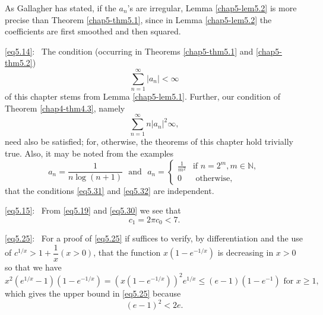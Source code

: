 \begin{lemma}\label{chap5-lem5.3}
As Gallagher \cite{key4} has stated, if the $a_n$'s are irregular,
Lemma \ref{chap5-lem5.2} is more precise than Theorem
\ref{chap5-thm5.1}, since in Lemma \ref{chap5-lem5.2} the coefficients
are first smoothed and then squared. 
\end{lemma}

\eqref{eq5.14}:~ The condition (occurring in Theorems
\ref{chap5-thm5.1} and \ref{chap5-thm5.2}) 
\begin{equation*}
\sum_{n=1}^\infty | a_n | < \infty \tag{5.31}\label{eq5.31}
\end{equation*}
of this chapter stems from Lemma \ref{chap5-lem5.1}. Further, our
condition of Theorem \ref{chap4-thm4.3}, namely 
\begin{equation*}
\sum_{n=1}^{\infty} n | a_n |^2 \infty , \tag{5.32}\label{eq5.32}
\end{equation*}
need also be satisfied; for, otherwise, the theorems of this chapter
hold trivially true. Also, it may be noted from the examples 
\begin{equation*}
a_n = \frac{1}{n \log (n+1)} \text{~ and~ } a_n =
\begin{cases}
\frac{1}{m^2} & \text{if } n = 2^m, m \in \mathbb{N},\\
0 & \text{ otherwise},
\end{cases} \tag{5.33}\label{eq5.33}
\end{equation*}
that the conditions \eqref{eq5.31} and \eqref{eq5.32} are independent.

\eqref{eq5.15}:~ From \eqref{eq5.19} and \eqref{eq5.30} we see that 
\begin{equation*}
c_1 = 2\pi c_0 < 7. \tag{5.34}\label{eq5.34}
\end{equation*}


\eqref{eq5.25}:~ For  a proof of \eqref{eq5.25} if suffices to verify, by
differentiation and the use of $c^{1/x}> 1 + \dfrac{1}{x}(x>0)$, that
the function $x(1-e^{-1/x})$ is decreasing in $x > 0$ so that we have  
\begin{equation*}
x^2(e^{1/x} -1)(1-e^{-1/x}) = (x(1-e^{-1/x}))^2 e^{1/x} \leq
(e-1)(1-e^{-1}) \text{ for } x \geq 1, \tag{5.35}\label{eq5.35} 
\end{equation*}
which gives the upper bound in \eqref{eq5.25} because
\begin{equation*}
(e-1)^2 < 2e. \tag{5.36}\label{eq5.36} 
\end{equation*}
